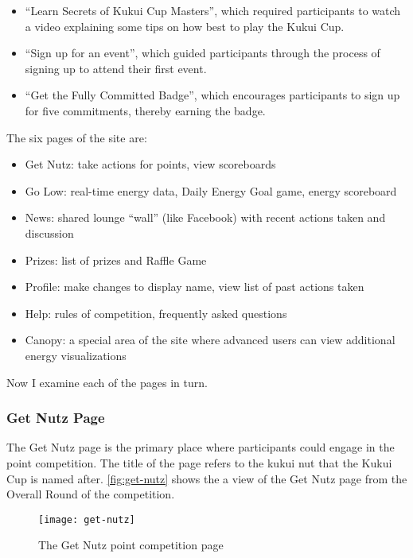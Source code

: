 \begin{itemize}
	\item ``Learn Secrets of Kukui Cup Masters'', which required participants to watch a video explaining some tips on how best to play the Kukui Cup.
	\item ``Sign up for an event'', which guided participants through the process of signing up to attend their first event.
	\item ``Get the Fully Committed Badge'', which encourages participants to sign up for five commitments, thereby earning the badge.
\end{itemize}

The six pages of the site are:
\begin{itemize}
	\item Get Nutz: take actions for points, view scoreboards
	\item Go Low: real-time energy data, Daily Energy Goal game, energy scoreboard
	\item News: shared lounge ``wall'' (like Facebook) with recent actions taken and discussion
	\item Prizes: list of prizes and Raffle Game
	\item Profile: make changes to display name, view list of past actions taken
	\item Help: rules of competition, frequently asked questions
	\item Canopy: a special area of the site where advanced users can view additional energy visualizations
\end{itemize}

Now I examine each of the pages in turn.


\subsubsection{Get Nutz Page}
\label{sec:get-nutz-page}

The Get Nutz page is the primary place where participants could engage in the point competition. The title of the page refers to the kukui nut that the Kukui Cup is named after. \autoref{fig:get-nutz} shows the a view of the Get Nutz page from the Overall Round of the competition.

\begin{figure}[htbp]
	\centering
		\texttt{[image: get-nutz]}
		\caption{The Get Nutz point competition page}
\label{fig:get-nutz}
\end{figure}

